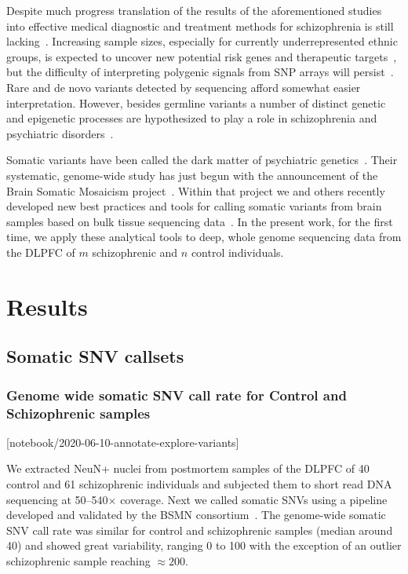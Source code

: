 \documentclass[letterpaper]{article}
\begin{document}
Despite much progress translation of the results of the aforementioned studies
into effective medical diagnostic and treatment methods for schizophrenia is
still lacking~\citep{Breen2016,Foley2017}. Increasing sample sizes, especially
for currently underrepresented ethnic groups, is expected to uncover new
potential risk genes and therapeutic targets~\citep{Visscher2017}, but the difficulty of interpreting
polygenic signals from SNP arrays will persist~\citep{Boyle2017}.  Rare and de
novo variants detected by sequencing afford somewhat easier interpretation.
However, besides germline variants a number of distinct genetic and epigenetic
processes are hypothesized to play a role in schizophrenia and psychiatric
disorders~\citep{PsychENCODEConsortium2015}.

Somatic variants have been called the dark matter of psychiatric
genetics~\citep{Insel2014}.  Their systematic, genome-wide study has just begun
with the announcement of the Brain Somatic Mosaicism
project~\citep{McConnell2017}.  Within that project we and others recently
developed new best practices and tools for calling somatic variants from brain
samples based on bulk tissue sequencing data~\citep{Wang2021}.  In the present
work, for the first time, we apply these analytical tools to deep, whole
genome sequencing data from the DLPFC of \(m\) schizophrenic and \(n\) control
individuals.

\section*{Results}

\subsection*{Somatic SNV callsets}

\subsubsection*{Genome wide somatic SNV call rate for Control and Schizophrenic samples}

[notebook/2020-06-10-annotate-explore-variants]

We extracted NeuN+ nuclei from postmortem samples of the DLPFC of 40 control
and 61 schizophrenic individuals and subjected them to short read DNA
sequencing at 50--540\(\times\) coverage.  Next we called somatic SNVs using a
pipeline developed and validated by the BSMN consortium~\citep{Wang2021}.  The
genome-wide somatic SNV call rate was similar for control and schizophrenic
samples (median around 40) and showed great variability, ranging 0 to 100 with
the exception of an outlier schizophrenic sample reaching \(\approx 200\).
\end{document}
